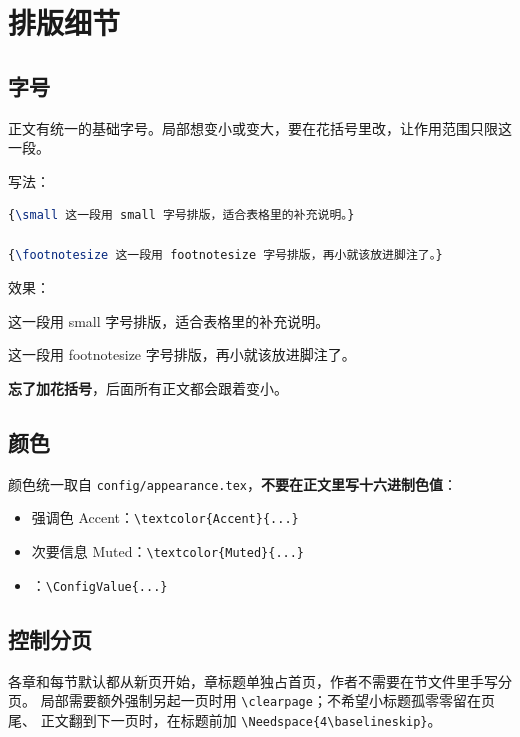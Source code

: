 \section{排版细节}
\label{sec:00-details}

\subsection{字号}

正文有统一的基础字号。局部想变小或变大，要在花括号里改，让作用范围只限这一段。

写法：

\begin{lstlisting}[language=TeX]
{\small 这一段用 small 字号排版，适合表格里的补充说明。}

{\footnotesize 这一段用 footnotesize 字号排版，再小就该放进脚注了。}
\end{lstlisting}

效果：

{\small 这一段用 small 字号排版，适合表格里的补充说明。}

{\footnotesize 这一段用 footnotesize 字号排版，再小就该放进脚注了。}

\textbf{忘了加花括号}，后面所有正文都会跟着变小。

\subsection{颜色}

颜色统一取自 \texttt{config/appearance.tex}，\textbf{不要在正文里写十六进制色值}：

\begin{itemize}
  \item \textcolor{Accent}{强调色 Accent}：\verb|\textcolor{Accent}{...}|
  \item \textcolor{Muted}{次要信息 Muted}：\verb|\textcolor{Muted}{...}|
  \item {}：\verb|\ConfigValue{...}|
\end{itemize}

\subsection{控制分页}

各章和每节默认都从新页开始，章标题单独占首页，作者不需要在节文件里手写分页。
局部需要额外强制另起一页时用 \verb|\clearpage|；不希望小标题孤零零留在页尾、
正文翻到下一页时，在标题前加 \verb|\Needspace{4\baselineskip}|。

